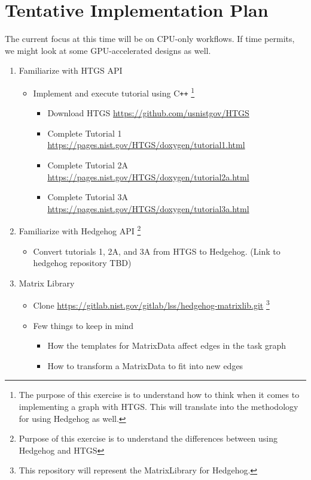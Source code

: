 \documentclass[]{article}
\begin{document}
\section{Tentative Implementation Plan}

The current focus at this time will be on CPU-only workflows. If time permits, we might look at some GPU-accelerated designs as well.

\begin{enumerate}
  \item Familiarize with HTGS API
  	\begin{itemize}
  		\item Implement and execute tutorial using C\texttt{++} \footnote{The purpose of this exercise is to understand how to think when it comes to implementing a graph with HTGS. This will translate into the methodology for using Hedgehog as well.}
  		\begin{itemize}
  			\item Download HTGS \url{https://github.com/usnistgov/HTGS}
  			\item Complete Tutorial 1 \url{https://pages.nist.gov/HTGS/doxygen/tutorial1.html}
  			\item Complete Tutorial 2A \url{https://pages.nist.gov/HTGS/doxygen/tutorial2a.html}
  			\item Complete Tutorial 3A \url{https://pages.nist.gov/HTGS/doxygen/tutorial3a.html}
  		\end{itemize} 
  	\end{itemize}
  \item Familiarize with Hedgehog API \footnote{Purpose of this exercise is to understand the differences between using Hedgehog and HTGS}
  	\begin{itemize}
  		\item Convert tutorials 1, 2A, and 3A from HTGS to Hedgehog. (Link to hedgehog repository TBD)
  	\end{itemize}
  \item Matrix Library 
  	\begin{itemize}
  		\item Clone \url{https://gitlab.nist.gov/gitlab/lss/hedgehog-matrixlib.git} \footnote{This repository will represent the MatrixLibrary for Hedgehog.} 
		\item Few things to keep in mind
  		\begin{itemize}
  			\item How the templates for MatrixData affect edges in the task graph
  			\item How to transform a MatrixData to fit into new edges

\end{itemize}
\end{itemize}
\end{enumerate}
\end{document}
